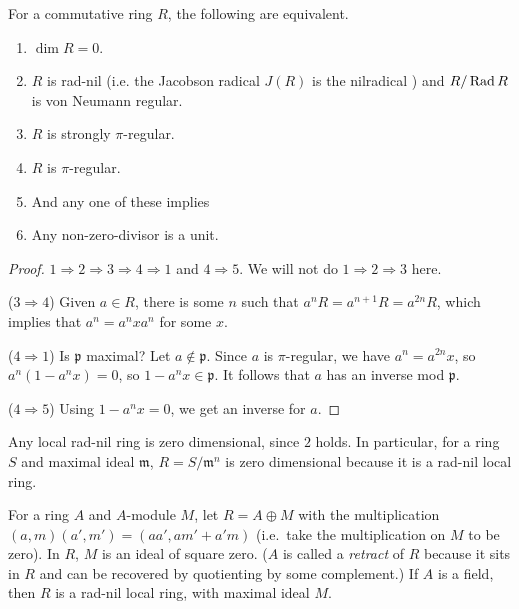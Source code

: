  \begin{theorem}[5.2]
   For a commutative ring $R$, the following are equivalent.
   \begin{enumerate}
     \item $\dim R=0$.
     \item $R$ is rad-nil (i.e. the Jacobson radical $J(R)$ is the nilradical ) and $R/\operatorname{Rad} R$ is von Neumann regular.
     \item $R$ is strongly $\pi$-regular.
     \item $R$ is $\pi$-regular.

     \item[] \hspace{-7ex} And any one of these implies
     \item Any non-zero-divisor is a unit.
   \end{enumerate}
 \end{theorem}
 \begin{proof}
   $1\Rightarrow 2\Rightarrow 3\Rightarrow 4 \Rightarrow 1$ and $4\Rightarrow 5$. We will
   not do $1\Rightarrow 2\Rightarrow 3$ here.

   ($3\Rightarrow 4$) Given $a\in R$, there is some $n$ such that $a^n R = a^{n+1}
   R=a^{2n}R$, which implies that $a^n = a^n x a^n$ for some $x$.

   ($4\Rightarrow 1$) Is $\mathfrak{p}$ maximal? Let $a\not\in \mathfrak{p}$.
	Since $a$ is $\pi$-regular, we
   have $a^n=a^{2n}x$, so $a^n(1-a^nx)=0$, so $1-a^nx\in \mathfrak{p}$. It follows that $a$ has an
   inverse mod $\mathfrak{p}$.

   ($4\Rightarrow 5$) Using $1-a^nx=0$, we get an inverse for $a$.
 \end{proof}
 \begin{example}
   Any local rad-nil ring is zero dimensional, since $2$ holds.
   In particular, for a ring $S$ and maximal ideal $\mathfrak{m}$,
	$R=S/\mathfrak{m}^n$ is zero dimensional
   because it is a rad-nil local ring.
 \end{example}
 \begin{example}
   For a ring $A$ and $A$-module $M$, let $R=A\oplus M$
   with the multiplication $(a,m)(a',m')=(aa',am'+a'm)$ (i.e.\ take the multiplication on
   $M$ to be zero). In $R$, $M$ is an ideal of square zero. ($A$ is called a
   \emph{retract} of $R$ because it sits in $R$ and can be recovered by quotienting by
   some complement.) If $A$ is a field, then $R$ is a rad-nil local ring, with maximal ideal $M$.
 \end{example}

